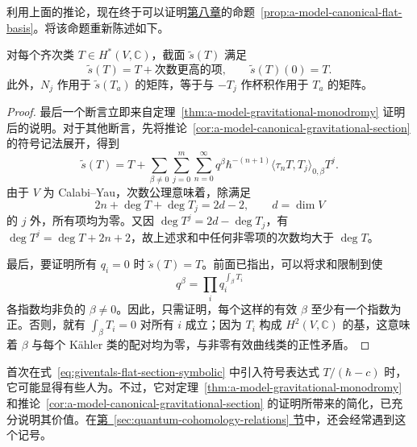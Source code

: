 利用上面的推论，现在终于可以证明\hyperref[chap:quantum-cohomology]{第八章}的命题~\ref{prop:a-model-canonical-flat-basis}。将该命题重新陈述如下。
\begin{corollary}\label{cor:a-model-canonical-section-triangular}
对每个齐次类 $T\in H^*(V,\mathbb C)$，截面 $\widetilde s(T)$ 满足
\[
\widetilde s(T)=T+\text{次数更高的项},\qquad\widetilde s(T)(0)=T.
\]
此外，$N_j$ 作用于 $\widetilde s(T_a)$ 的矩阵，等于与 $-T_j$ 作杯积作用于 $T_a$ 的矩阵。
\end{corollary}
\begin{proof}
最后一个断言立即来自定理~\ref{thm:a-model-gravitational-monodromy} 证明后的说明。对于其他断言，先将推论~\ref{cor:a-model-canonical-gravitational-section} 的符号记法展开，得到
\[
\widetilde s(T)=T+\sum_{\beta\ne0}\sum_{j=0}^m\sum_{n=0}^{\infty}
q^\beta\hbar^{-(n+1)}\langle\tau_nT,T_j\rangle_{0,\beta}T^j.
\]
由于 $V$ 为 Calabi--Yau，次数公理意味着，除满足
\[
2n+\deg T+\deg T_j=2d-2,\qquad d=\dim V
\]
的 $j$ 外，所有项均为零。又因 $\deg T^j=2d-\deg T_j$，有 $\deg T^j=\deg T+2n+2$，故上述求和中任何非零项的次数均大于 $\deg T$。

最后，要证明所有 $q_i=0$ 时 $\widetilde s(T)=T$。前面已指出，可以将求和限制到使
\[
q^\beta=\prod_iq_i^{\int_\beta T_i}
\]
各指数均非负的 $\beta\ne0$。因此，只需证明，每个这样的有效 $\beta$ 至少有一个指数为正。否则，就有 $\int_\beta T_i=0$ 对所有 $i$ 成立；因为 $T_i$ 构成 $H^2(V,\mathbb C)$ 的基，这意味着 $\beta$ 与每个 Kähler 类的配对均为零，与非零有效曲线类的正性矛盾。
\end{proof}

首次在式~\eqref{eq:giventals-flat-section-symbolic} 中引入符号表达式 $T/(\hbar-c)$ 时，它可能显得有些人为。不过，它对定理~\ref{thm:a-model-gravitational-monodromy} 和推论~\ref{cor:a-model-canonical-gravitational-section} 的证明所带来的简化，已充分说明其价值。在\hyperref[sec:quantum-cohomology-relations]{第~\ref*{sec:quantum-cohomology-relations} 节}中，还会经常遇到这个记号。

